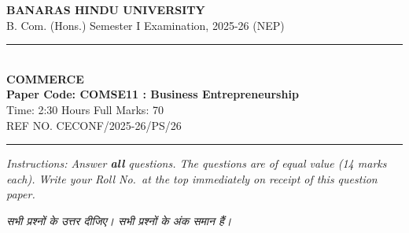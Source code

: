 \documentclass[11pt,a4paper]{article}
\begin{document}
\begin{center}
  {\large\bfseries BANARAS HINDU UNIVERSITY}\\[2pt]
  {\normalsize B. Com. (Hons.) Semester I Examination, 2025-26 (NEP)}\\[6pt]
  \rule{0.8\linewidth}{0.5pt}\\[6pt]
  {\large\bfseries COMMERCE}\\[4pt]
  {\large\bfseries Paper Code: COMSE11 : Business Entrepreneurship}\\[4pt]
  {\normalsize Time: 2:30 Hours \hfill Full Marks: 70}\\[2pt]
  {\small REF NO. CECONF/2025-26/PS/26}
\end{center}
\rule{\linewidth}{0.4pt}
\smallskip

\noindent \textit{Instructions: Answer \textbf{all} questions. The questions are of equal value (14 marks each). Write your Roll No.\ at the top immediately on receipt of this question paper.}

\smallskip
\noindent \textit{सभी प्रश्नों के उत्तर दीजिए। सभी प्रश्नों के अंक समान हैं।}

\bigskip
\end{document}
